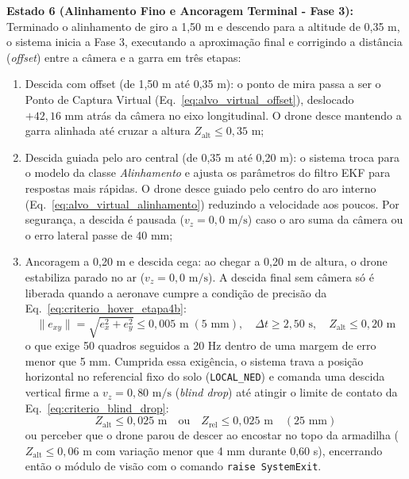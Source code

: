 \textbf{Estado 6 (Alinhamento Fino e Ancoragem Terminal - Fase 3):} Terminado o alinhamento de giro a 1,50 m e descendo para a altitude de 0,35 m, o sistema inicia a Fase 3, executando a aproximação final e corrigindo a distância (\textit{offset}) entre a câmera e a garra em três etapas:
\begin{enumerate}
	\item Descida com offset (de 1,50 m até 0,35 m): o ponto de mira passa a ser o Ponto de Captura Virtual (Eq.~\eqref{eq:alvo_virtual_offset}), deslocado $+42,16\text{ mm}$ atrás da câmera no eixo longitudinal. O drone desce mantendo a garra alinhada até cruzar a altura $Z_{\text{alt}} \le 0,35\text{ m}$;
	\item Descida guiada pelo aro central (de 0,35 m até 0,20 m): o sistema troca para o modelo da classe \textit{Alinhamento} e ajusta os parâmetros do filtro EKF para respostas mais rápidas. O drone desce guiado pelo centro do aro interno (Eq.~\eqref{eq:alvo_virtual_alinhamento}) reduzindo a velocidade aos poucos. Por segurança, a descida é pausada ($v_z = 0,0\text{ m/s}$) caso o aro suma da câmera ou o erro lateral passe de 40 mm;
	\item Ancoragem a 0,20 m e descida cega: ao chegar a 0,20 m de altura, o drone estabiliza parado no ar ($v_z = 0,0\text{ m/s}$). A descida final sem câmera só é liberada quando a aeronave cumpre a condição de precisão da Eq.~\eqref{eq:criterio_hover_etapa4b}:
	\begin{equation}
		\|e_{xy}\| = \sqrt{e_x^2 + e_y^2} \le 0,005\text{ m} \; (5\text{ mm}), \quad \Delta t \ge 2,50\text{ s}, \quad Z_{\text{alt}} \le 0,20\text{ m}
		\label{eq:criterio_hover_etapa4b}
	\end{equation}
	o que exige 50 quadros seguidos a 20 Hz dentro de uma margem de erro menor que 5 mm. Cumprida essa exigência, o sistema trava a posição horizontal no referencial fixo do solo (\texttt{LOCAL\_NED}) e comanda uma descida vertical firme a $v_z = 0,80\text{ m/s}$ (\textit{blind drop}) até atingir o limite de contato da Eq.~\eqref{eq:criterio_blind_drop}:
	\begin{equation}
		Z_{\text{alt}} \le 0,025\text{ m} \quad \text{ou} \quad Z_{\text{rel}} \le 0,025\text{ m} \quad (25\text{ mm})
		\label{eq:criterio_blind_drop}
	\end{equation}
	ou perceber que o drone parou de descer ao encostar no topo da armadilha ($Z_{\text{alt}} \le 0,06\text{ m}$ com variação menor que 4 mm durante 0,60 s), encerrando então o módulo de visão com o comando \texttt{raise SystemExit}.
\end{enumerate}

